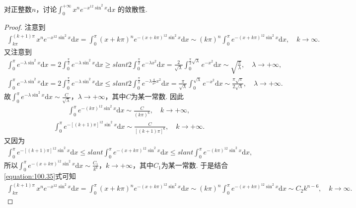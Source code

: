 \documentclass[../../main.tex]{subfiles}
\begin{document}
\begin{example}
对正整数\(n\)，讨论$\int_{0}^{+\infty}x^{n}e^{-x^{12}\sin^{2}x}\mathrm{d}x$
的敛散性. 
\end{example}
\begin{proof}
注意到
\begin{align}\label{equation:100.35}
\int_{k\pi}^{(k+1)\pi}x^ne^{-x^{12}\sin^2x}\mathrm{d}x=\int_0^{\pi}(x+k\pi)^ne^{-(x+k\pi)^{12}\sin^2x}\mathrm{d}x\sim (k\pi)^n\int_0^{\pi}e^{-(x+k\pi)^{12}\sin^2x}\mathrm{d}x,\quad k\rightarrow \infty.
\end{align}
又注意到
\begin{align*}
\int_0^{\pi}e^{-\lambda \sin^2x}\mathrm{d}x=2\int_0^{\frac{\pi}{2}}e^{-\lambda \sin^2x}\mathrm{d}x\geqslant slant 2\int_0^{\frac{\pi}{2}}e^{-\lambda x^2}\mathrm{d}x=\frac{2}{\sqrt{\lambda}}\int_0^{\frac{\pi}{2}\sqrt{\lambda}}e^{-x^2}\mathrm{d}x\sim \sqrt{\frac{\pi}{\lambda}},\quad \lambda \rightarrow +\infty,
\end{align*}
\begin{align*}
\int_0^{\pi}e^{-\lambda \sin^2x}\mathrm{d}x=2\int_0^{\frac{\pi}{2}}e^{-\lambda \sin^2x}\mathrm{d}x\leqslant slant 2\int_0^{\frac{\pi}{2}}e^{-\lambda \frac{4}{\pi^2}x^2}\mathrm{d}x=\frac{\pi}{\sqrt{\lambda}}\int_0^{\sqrt{\lambda}}e^{-x^2}\mathrm{d}x\sim \frac{\pi \sqrt{\pi}}{2\sqrt{\lambda}},\quad \lambda \rightarrow +\infty.
\end{align*}
故$\int_0^{\pi}e^{-\lambda \sin^2x}\mathrm{d}x\sim \frac{C}{\sqrt{\lambda}}$，$\lambda \rightarrow +\infty$，其中$C$为某一常数. 因此
\begin{align*}
\int_0^{\pi}e^{-(k\pi)^{12}\sin^2x}\mathrm{d}x\sim \frac{C}{(k\pi)^6},\quad k\rightarrow +\infty,
\end{align*}
\begin{align*}
\int_0^{\pi}e^{-[(k+1)\pi]^{12}\sin^2x}\mathrm{d}x\sim \frac{C}{[(k+1)\pi]^6},\quad k\rightarrow +\infty.
\end{align*}
又因为
\begin{align*}
\int_0^{\pi}e^{-[(k+1)\pi]^{12}\sin^2x}\mathrm{d}x\leqslant slant \int_0^{\pi}e^{-(x+k\pi)^{12}\sin^2x}\mathrm{d}x\leqslant slant \int_0^{\pi}e^{-(k\pi)^{12}\sin^2x}\mathrm{d}x,
\end{align*}
所以$\int_0^{\pi}e^{-(x+k\pi)^{12}\sin^2x}\mathrm{d}x\sim \frac{C_1}{k^6}$，$k\rightarrow +\infty$，其中$C_1$为某一常数. 于是结合\eqref{equation:100.35}式可知
\begin{align*}
\int_{k\pi}^{(k+1)\pi}x^ne^{-x^{12}\sin^2x}\mathrm{d}x=\int_0^{\pi}(x+k\pi)^ne^{-(x+k\pi)^{12}\sin^2x}\mathrm{d}x\sim (k\pi)^n\int_0^{\pi}e^{-(x+k\pi)^{12}\sin^2x}\mathrm{d}x\sim C_2k^{n-6},\quad k\rightarrow \infty.

\end{align*}
\end{proof}
\end{document}
